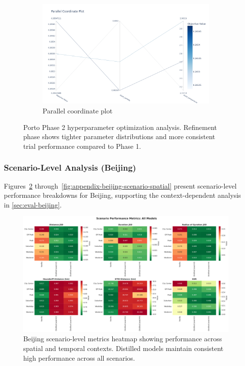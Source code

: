 \begin{figure}[H]
    \begin{subfigure}{0.49\linewidth}
        \centering
        \includegraphics[width=\linewidth]{assets/plots/eval/porto/optuna/phase2/parallel_coordinate.pdf}
        \caption{Parallel coordinate plot}
    \end{subfigure}
    \caption{Porto Phase 2 hyperparameter optimization analysis. Refinement phase shows tighter parameter distributions and more consistent trial performance compared to Phase 1.}
    \label{fig:appendix-optuna-phase2}
\end{figure}

\subsubsection{Scenario-Level Analysis (Beijing)}
\label{app:scenario-beijing}

Figures~\ref{fig:appendix-beijing-scenario-heatmap} through~\ref{fig:appendix-beijing-scenario-spatial} present scenario-level performance breakdowns for Beijing, supporting the context-dependent analysis in \autoref{sec:eval-beijing}.

\begin{figure}[H]
    \centering
    \includegraphics[width=0.85\linewidth]{assets/plots/eval/beijing/scenarios/scenario_metrics_heatmap.pdf}
    \caption{Beijing scenario-level metrics heatmap showing performance across spatial and temporal contexts. Distilled models maintain consistent high performance across all scenarios.}
    \label{fig:appendix-beijing-scenario-heatmap}
\end{figure}

